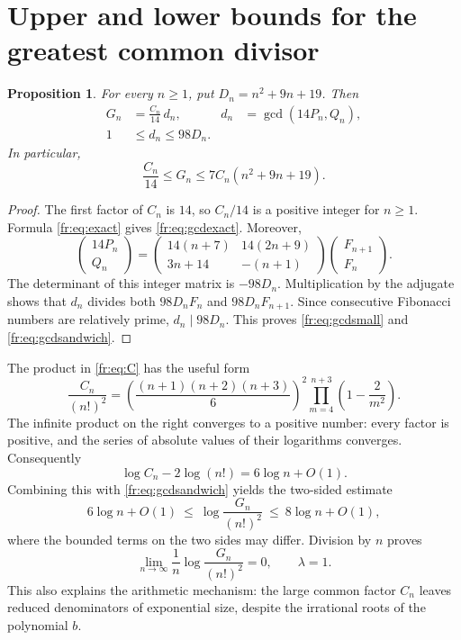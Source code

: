 \documentclass[11pt,a4paper]{article}
\newcommand{\Q}{\mathbb Q}
\newtheorem{proposition}[theorem]{Proposition}
\theoremstyle{definition}
\theoremstyle{remark}
\numberwithin{equation}{section}
\begin{document}
\section{Upper and lower bounds for the greatest common divisor}

\begin{proposition}\label{fr:prop:gcd}
For every $n\ge1$, put $D_n=n^2+9n+19$. Then
\begin{align}
 G_n&=\frac{C_n}{14}\,d_n,
 &d_n&=\gcd(14P_n,Q_n),\label{fr:eq:gcdexact}\\
 1&\le d_n\le98D_n.\label{fr:eq:gcdsmall}
\end{align}
In particular,
\begin{equation}\label{fr:eq:gcdsandwich}
 \frac{C_n}{14}\le G_n\le7C_n(n^2+9n+19).
\end{equation}
\end{proposition}

\begin{proof}
The first factor of $C_n$ is $14$, so $C_n/14$ is a positive
integer for $n\ge1$. Formula \eqref{fr:eq:exact} gives
\eqref{fr:eq:gcdexact}. Moreover,
\[
 \begin{pmatrix}14P_n\\Q_n\end{pmatrix}
 =
 \begin{pmatrix}
 14(n+7)&14(2n+9)\\
 3n+14&-(n+1)
 \end{pmatrix}
 \begin{pmatrix}F_{n+1}\\F_n\end{pmatrix}.
\]
The determinant of this integer matrix is $-98D_n$.
Multiplication by the adjugate shows that $d_n$ divides both
$98D_nF_n$ and $98D_nF_{n+1}$. Since consecutive Fibonacci
numbers are relatively prime, $d_n\mid98D_n$. This proves
\eqref{fr:eq:gcdsmall} and \eqref{fr:eq:gcdsandwich}.
\end{proof}

The product in \eqref{fr:eq:C} has the useful form
\begin{equation}\label{fr:eq:product}
 \frac{C_n}{(n!)^2}
 =\left(\frac{(n+1)(n+2)(n+3)}6\right)^2
   \prod_{m=4}^{n+3}\left(1-\frac2{m^2}\right).
\end{equation}
The infinite product on the right converges to a positive number:
every factor is positive, and the series of absolute values of
their logarithms converges. Consequently
\[
       \log C_n-2\log(n!)=6\log n+O(1).
\]
Combining this with \eqref{fr:eq:gcdsandwich} yields the two-sided
estimate
\[
 6\log n+O(1)
 \ \le\ \log\frac{G_n}{(n!)^2}
 \ \le\ 8\log n+O(1),
\]
where the bounded terms on the two sides may differ. Division
by $n$ proves
\begin{equation}\label{fr:eq:lambda}
 \lim_{n\to\infty}\frac1n
       \log\frac{G_n}{(n!)^2}=0,
 \qquad\lambda=1.
\end{equation}
This also explains the arithmetic mechanism: the large common
factor $C_n$ leaves reduced denominators of exponential size,
despite the irrational roots of the polynomial $b$.
\end{document}
